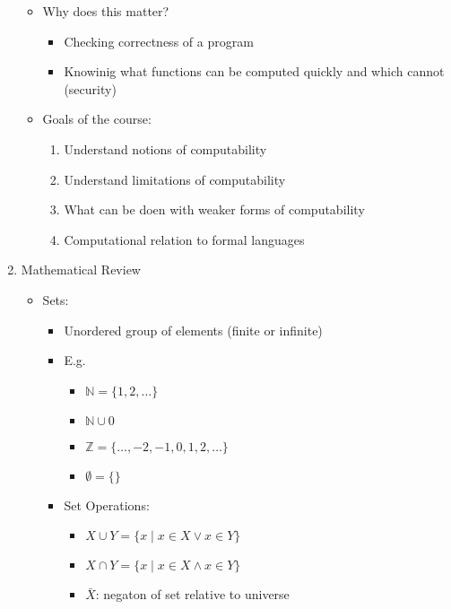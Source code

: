 \documentclass[12pt]{article}
\begin{document}
\begin{enumerate}
\begin{itemize}
\begin{enumerate}
            \end{enumerate}
            \item Why does this matter?
            \begin{itemize}
                \item Checking correctness of a program
                \item Knowinig what functions can be computed quickly and which cannot (security)
            \end{itemize}
            \item Goals of the course:
            \begin{enumerate}
                \item Understand notions of computability
                \item Understand limitations of computability
                \item What can be doen with weaker forms of computability
                \item Computational relation to formal languages
            \end{enumerate}
        \end{itemize}
        \item Mathematical Review
        \begin{itemize}
            \item Sets:
            \begin{itemize}
                \item Unordered group of elements (finite or infinite)
                \item E.g.
                \begin{itemize}
                    \item $\mathbb{N} = \{1, 2, \ldots\}$
                    \item $\mathbb{N} \cup {0}$
                    \item $\mathbb{Z} = \{\ldots, -2, -1, 0, 1, 2, \ldots\}$
                    \item $\emptyset = \{\}$
                \end{itemize}
                \item Set Operations:
                \begin{itemize}
                    \item $X \cup Y = \{x \mid x \in X \lor x \in Y\}$
                    \item $X \cap Y = \{x \mid x \in X \land x \in Y\}$
                    \item $\bar{X}$: negaton of set relative to universe

\end{itemize}
\end{itemize}
\end{itemize}
\end{enumerate}
\end{document}
